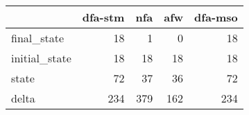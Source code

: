 \begin{tabular}{lrrrr}
\toprule
{} &  dfa-stm &  nfa &  afw &  dfa-mso \\
\midrule
final\_state   &       18 &    1 &    0 &       18 \\
initial\_state &       18 &   18 &   18 &       18 \\
state         &       72 &   37 &   36 &       72 \\
delta         &      234 &  379 &  162 &      234 \\
\bottomrule
\end{tabular}
